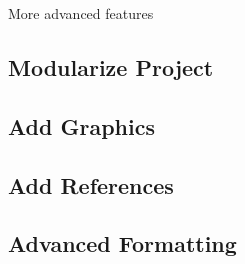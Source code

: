 More advanced features
\subsection{Modularize Project}
\subsection{Add Graphics}
\subsection{Add References}
\subsection{Advanced Formatting}